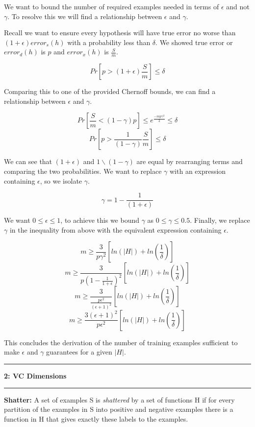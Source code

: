\documentclass[11pt]{article}
\newcommand\question[2]{\vspace{.25in}\hrule\textbf{#1: #2}\vspace{.5em}\hrule\vspace{.10in}}
\begin{document}

We want to bound the number of required examples needed in terms of $\epsilon$ and not $\gamma$. To resolve this we will find a relationship between $\epsilon$ and $\gamma$. 

Recall we want to ensure every hypothesis will have true error no worse than $(1 + \epsilon)error_s(h)$ with a probability less than $\delta$. We showed true error or $error_d(h)$ is $p$ and $error_x(h)$ is $\frac{S}{m}$.

$$Pr[p  > (1 + \epsilon) \frac{S}{m}] \leq \delta$$

Comparing this to one of the provided Chernoff bounds, we can find a relationship between $\epsilon$ and $\gamma$.

$$Pr[\frac{S}{m} < (1 - \gamma)p] \leq e^{\frac{-mp\gamma^2}{2}} \leq \delta$$
$$Pr[p > \frac{1}{(1 - \gamma)}\frac{S}{m}] \leq \delta$$

We can see that $(1 + \epsilon)$ and $1 \backslash (1 - \gamma)$ are equal by rearranging terms and comparing the two probabilities. We want to replace $\gamma$ with an expression containing $\epsilon$, so we isolate $\gamma$.

$$\gamma = 1 - \frac{1}{(1 + \epsilon)}$$

We want $0 \leq \epsilon \leq 1$, to achieve this we bound $\gamma$ as $0 \leq \gamma \leq 0.5$. Finally, we replace $\gamma$ in the inequality from above with the equivalent expression containing $\epsilon$.

$$ m \geq \frac{3}{p\gamma^2}[ln(|H|) + ln(\frac{1}{\delta})]$$
$$ m \geq \frac{3}{p(1 - \frac{1}{1 + \epsilon})^2}[ln(|H|) + ln(\frac{1}{\delta})]$$
$$ m \geq \frac{3}{\frac{p\epsilon^2}{(\epsilon + 1)^2}}[ln(|H|) + ln(\frac{1}{\delta})]$$
$$ m \geq \frac{3(\epsilon + 1)^2}{p \epsilon^2}[ln(|H|) + ln(\frac{1}{\delta})]$$

This concludes the derivation of the number of training examples sufficient to make $\epsilon$ and $\gamma$ guarantees for a given $|H|$.


\question{2}{VC Dimensions}
\textbf{Shatter:} A set of examples S is \textit{shattered} by a set of functions H if for every partition of the examples in S into positive and negative examples there is a function in H that gives exactly these labels to the examples.
\end{document}
